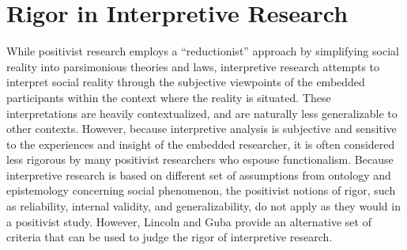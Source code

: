 \section{Rigor in Interpretive Research}

While positivist research employs a ``reductionist'' approach by simplifying social reality into parsimonious theories and laws, interpretive research attempts to interpret social reality through the subjective viewpoints of the embedded participants within the context where the reality is situated. These interpretations are heavily contextualized, and are naturally less generalizable to other contexts. However, because interpretive analysis is subjective and sensitive to the experiences and insight of the embedded researcher, it is often considered less rigorous by many \gls{positivist} researchers who espouse \gls{functionalism}. Because interpretive research is based on different set of assumptions from \gls{ontology} and \gls{epistemology} concerning social phenomenon, the positivist notions of rigor, such as reliability, internal validity, and generalizability, do not apply as they would in a positivist study. However, Lincoln and Guba\cite{lincoln1985naturalistic} provide an alternative set of criteria that can be used to judge the rigor of interpretive research.

